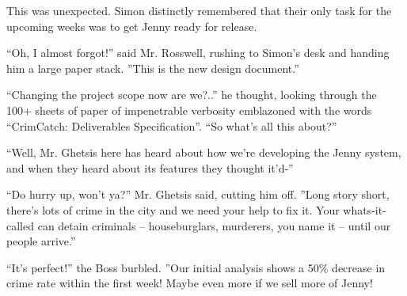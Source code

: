 \documentclass[10pt,a4paper]{article}
\newcommand{\lang}[2]{ #2 \par}
\newcommand{\ainame}{Jenny}
\newcommand{\mainname}{Simon}
\newcommand{\ceoname}{Mr. Rosswell}
\newcommand{\policename}{Mr. Ghetsis}
\newcommand{\featurename}{CrimCatch}
\begin{document}
\lang{Это было неожиданно. \mainname{} точно помнил, что у них была единственная задача -- подготовить \ainame{} к продажам.}{This was unexpected. \mainname{} distinctly remembered that their only task for the upcoming weeks was to get \ainame{} ready for release.}

\lang{-- Ах да, совсем забыл! -- сказал \ceoname{}, подегая к столу \mainname{} и кидая на него большую стопку бумаг. -- Это новая спецификация.}{``Oh, I almost forgot!'' said \ceoname{}, rushing to \mainname{}'s desk and handing him a large paper stack. ''This is the new design document.''}

\lang{-- Ах, так вот теперь изволите изменять цели? -- подумал \mainname{}, глядя на кипу из сотен листов с надписью: ``\featurename{}: техзадание''. -- Ну и про что всё это?}{``Changing the project scope now are we?..'' he thought, looking through the 100+ sheets of paper of impenetrable verbosity emblazoned with the words ``\featurename{}: Deliverables Specification''. ``So what's all this about?''}

\lang{-- Ну, вот тут \policename{} узнал про то, что мы делаем \ainame{}, и когда он узнал про функции, подумал- }{``Well, \policename{} here has heard about how we're developing the \ainame{} system, and when they heard about its features they thought it'd-''}

\lang{-- А вот никак нельзя побыстрее? -- сказал \policename{}, и \ceoname{} замолк. -- Короче говоря, в городе полно преступности, и вы нам поможее справиться с ней. Ваша как-её-там может задерживать преступников -- воров, убийц, да кого угодно -- пока наши люди не приедут.}{``Do hurry up, won't ya?'' \policename{} said, cutting him off. ''Long story short, there's lots of crime in the city and we need your help to fix it. Your whats-it-called can detain criminals -- houseburglars, murderers, you name it -- until our people arrive.''}

\lang{-- Это превосходно! -- поддерживал директор, -- Наш анализ показывает уменьшение преступности на 50\% в течение первой недели! А если продажи \ainame{} будут выше, то будет ещё больше!}{``It's perfect!'' the Boss burbled. ''Our initial analysis shows a 50\% decrease in crime rate within the first week! Maybe even more if we sell more of \ainame{}!}
\end{document}
